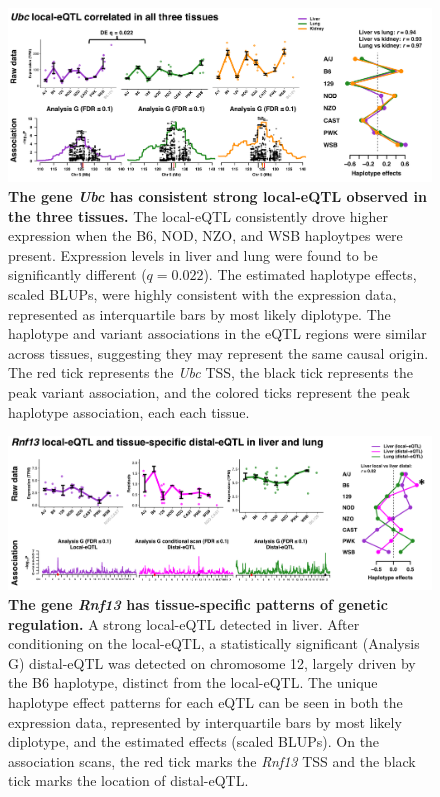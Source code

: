 \documentclass[9pt,twocolumn,twoside]{gsajnl}
\begin{document}
\begin{figure}[hp]
\renewcommand{\familydefault}{\sfdefault}\normalfont
\centering
\includegraphics[width=\textwidth, trim={0in 0in 0in 0in}, clip]{figs/ubc_correlated_eqtl.png}
\caption{\textbf{The gene \textit{Ubc} has consistent strong local-eQTL observed in the three tissues.} 
The local-eQTL consistently drove higher expression when the B6, NOD, NZO, and WSB haploytpes were present. Expression levels in liver and lung were found to be significantly different ($q = 0.022$). The estimated haplotype effects, scaled BLUPs, were highly consistent with the expression data, represented as interquartile bars by most likely diplotype. The haplotype and variant associations in the eQTL regions were similar across tissues, suggesting they may represent the same causal origin. The red tick represents the \textit{Ubc} TSS, the black tick represents the peak variant association, and the colored ticks represent the peak haplotype association, each each tissue.
\label{fig:ubc_correlated_eqtl}}
\end{figure}

\begin{figure}[hp]
\renewcommand{\familydefault}{\sfdefault}\normalfont
\centering
\includegraphics[width=\textwidth, trim={0in 0in 0in 0in}, clip]{figs/rnf13_distal_eqtl.png}
\caption{\textbf{The gene \textit{Rnf13} has tissue-specific patterns of genetic regulation.} 
A strong local-eQTL detected in liver. After conditioning on the local-eQTL, a statistically significant (Analysis G) distal-eQTL was detected on chromosome 12, largely driven by the B6 haplotype, distinct from the local-eQTL. The unique haplotype effect patterns for each eQTL can be seen in both the expression data, represented by interquartile bars by most likely diplotype, and the estimated effects (scaled BLUPs). On the association scans, the red tick marks the \textit{Rnf13} TSS and the black tick marks the location of distal-eQTL.
\label{fig:rnf13_distal_eqtl}}
\end{figure}
\end{document}
